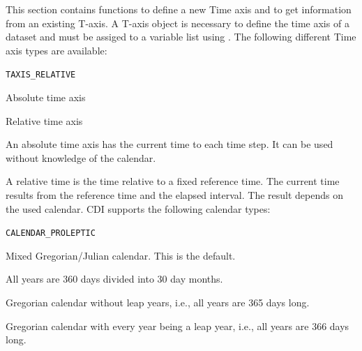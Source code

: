 This section contains functions to define a new Time axis
and to get information from an existing T-axis.
A T-axis  object is necessary to define the time axis of a dataset
and must be assiged to a variable list using .
The following different Time axis types are available:

\vspace*{3mm}
\hspace*{8mm}\begin{minipage}{15cm}
\begin{deflist}{{\large\tt TAXIS\_RELATIVE \ \ }}
\item[{\large\tt TAXIS\_ABSOLUTE}]  Absolute time axis    
\item[{\large\tt TAXIS\_RELATIVE}]  Relative time axis
\end{deflist}
\end{minipage}
\vspace*{3mm}

An absolute time axis has the current time to each time step.
It can be used without knowledge of the calendar.

A relative time is the time relative to a fixed reference time.
The current time results from the reference time and the elapsed interval.
The result depends on the used calendar.
CDI supports the following calendar types:

\vspace*{3mm}
\hspace*{8mm}\begin{minipage}{15cm}
\begin{deflist}{{\large\tt CALENDAR\_PROLEPTIC \ \ }}
\item[{\large\tt CALENDAR\_STANDARD}]  Mixed Gregorian/Julian calendar. This is the default.
\item[{\large\tt CALENDAR\_360DAYS }]  All years are 360 days divided into 30 day months.
\item[{\large\tt CALENDAR\_365DAYS }]  Gregorian calendar without leap years, i.e., all years are 365 days long.
\item[{\large\tt CALENDAR\_366DAYS }]  Gregorian calendar with every year being a leap year, i.e., all years are 366 days long.
\end{deflist}
\end{minipage}
